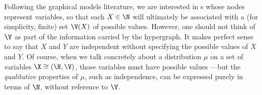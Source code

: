 Following the graphical models literature, we are interested in \hgraph s whose nodes represent variables,
so that each $X \in \N$ will ultimately be associated with a
(for simplicity, finite)
set $\V(X)$ of possible values.
However, one should not think of $\V$ as part of the information carried by the hypergraph. 
{%
It makes perfect sense to say that $X$ and $Y$ are independent without specifying the possible values of $X$ and $Y$.
}%
Of course, when we talk concretely about a distribution $\mu$ on a set of variables $\X \cong (\N, \V)$, those variables must have possible values
\unskip---but the \emph{qualitative} properties of $\mu$, such as independence, can be expressed purely in terms of $\N$, without reference to $\V$. 
%
%
